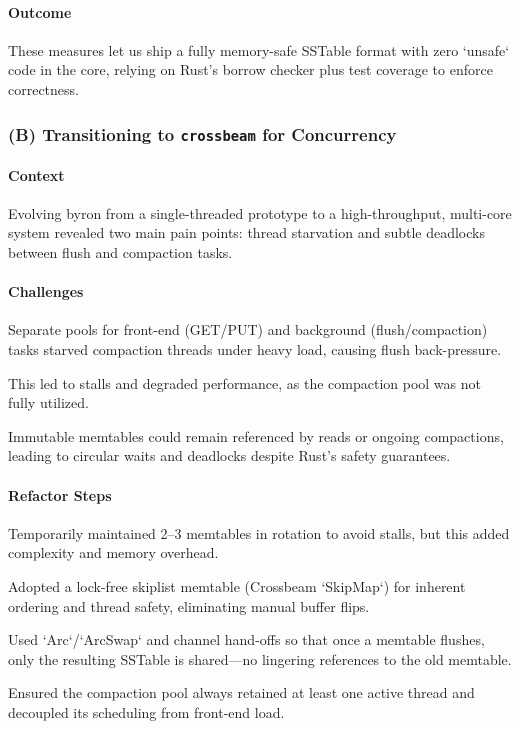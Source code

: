 \documentclass[10pt]{article}
\begin{document}
\paragraph{Outcome}
These measures let us ship a fully memory-safe SSTable format with zero `unsafe` code in the core, relying on Rust’s borrow checker plus test coverage to enforce correctness.

\subsubsection*{(B) Transitioning to \texttt{crossbeam} for Concurrency}

\paragraph{Context}
Evolving byron from a single-threaded prototype to a high-throughput, multi-core system revealed two main pain points: thread starvation and subtle deadlocks between flush and compaction tasks.

\paragraph{Challenges}
\begin{description}[leftmargin=1em,labelwidth=*,itemsep=0.5ex]
  \item[Thread Contention \& Starvation] Separate pools for front-end (GET/PUT) and background (flush/compaction) tasks starved compaction threads under heavy load, causing flush back-pressure.
  \item[] This led to stalls and degraded performance, as the compaction pool was not fully utilized.
  \item[Deadlock in Flush/Compaction] Immutable memtables could remain referenced by reads or ongoing compactions, leading to circular waits and deadlocks despite Rust’s safety guarantees.
\end{description}

\paragraph{Refactor Steps}
\begin{description}[leftmargin=1em,labelwidth=*,itemsep=0.5ex]
  \item[Array of Memtables (Stop-Gap)] Temporarily maintained 2–3 memtables in rotation to avoid stalls, but this added complexity and memory overhead.
  \item[Migrate to Crossbeam SkipMap] Adopted a lock-free skiplist memtable (Crossbeam `SkipMap`) for inherent ordering and thread safety, eliminating manual buffer flips.
  \item[Clear Ownership Hand-Off] Used `Arc`/`ArcSwap` and channel hand-offs so that once a memtable flushes, only the resulting SSTable is shared—no lingering references to the old memtable.
  \item[Fine-Grained Scheduling] Ensured the compaction pool always retained at least one active thread and decoupled its scheduling from front-end load.
\end{description}
\end{document}
